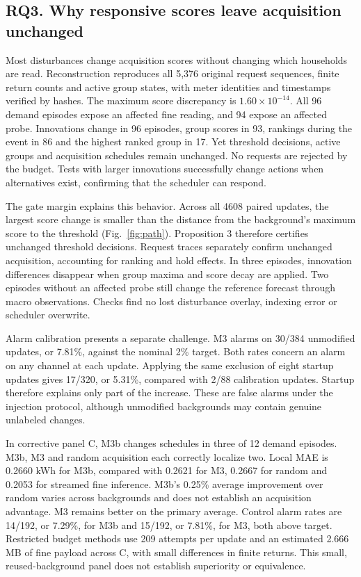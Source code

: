 \documentclass[conference]{IEEEtran}
\newcommand{\MarginChecks}{4608}
\begin{document}
\subsection{RQ3. Why responsive scores leave acquisition unchanged}
Most disturbances change acquisition scores without changing which households are read. Reconstruction reproduces all 5,376 original request sequences, finite return counts and active group states, with meter identities and timestamps verified by hashes. The maximum score discrepancy is $1.60\times10^{-14}$. All 96 demand episodes expose an affected fine reading, and 94 expose an affected probe. Innovations change in 96 episodes, group scores in 93, rankings during the event in 86 and the highest ranked group in 17. Yet threshold decisions, active groups and acquisition schedules remain unchanged. No requests are rejected by the budget. Tests with larger innovations successfully change actions when alternatives exist, confirming that the scheduler can respond.

The gate margin explains this behavior. Across all \MarginChecks{} paired updates, the largest score change is smaller than the distance from the background's maximum score to the threshold (Fig.~\ref{fig:path}). Proposition 3 therefore certifies unchanged threshold decisions. Request traces separately confirm unchanged acquisition, accounting for ranking and hold effects. In three episodes, innovation differences disappear when group maxima and score decay are applied. Two episodes without an affected probe still change the reference forecast through macro observations. Checks find no lost disturbance overlay, indexing error or scheduler overwrite.

Alarm calibration presents a separate challenge. M3 alarms on 30/384 unmodified updates, or 7.81\%, against the nominal 2\% target. Both rates concern an alarm on any channel at each update. Applying the same exclusion of eight startup updates gives 17/320, or 5.31\%, compared with 2/88 calibration updates. Startup therefore explains only part of the increase. These are false alarms under the injection protocol, although unmodified backgrounds may contain genuine unlabeled changes.

In corrective panel C, M3b changes schedules in three of 12 demand episodes. M3b, M3 and random acquisition each correctly localize two. Local MAE is 0.2660 kWh for M3b, compared with 0.2621 for M3, 0.2667 for random and 0.2053 for streamed fine inference. M3b's 0.25\% average improvement over random varies across backgrounds and does not establish an acquisition advantage. M3 remains better on the primary average. Control alarm rates are 14/192, or 7.29\%, for M3b and 15/192, or 7.81\%, for M3, both above target. Restricted budget methods use 209 attempts per update and an estimated 2.666 MB of fine payload across C, with small differences in finite returns. This small, reused-background panel does not establish superiority or equivalence.
\end{document}

